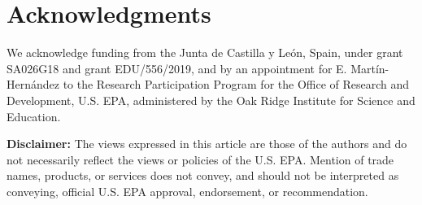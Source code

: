 \documentclass[10pt,a4paper]{article}
\begin{document}
\section{Acknowledgments} \label{Acknowledgments}
We acknowledge funding from the Junta de Castilla y Le\'{o}n, Spain, under grant SA026G18 and grant EDU/556/2019, and by an appointment for E. Mart\'{i}n-Hern\'{a}ndez to the Research Participation Program for the Office of Research and Development, U.S. EPA, administered by the Oak Ridge Institute for Science and Education. 

\textbf{Disclaimer:} The views expressed in this article are those of the authors and do not necessarily reflect the views or policies of the U.S. EPA. Mention of trade names, products, or services does not convey, and should not be interpreted as conveying, official U.S. EPA approval, endorsement, or recommendation.



\end{document}
